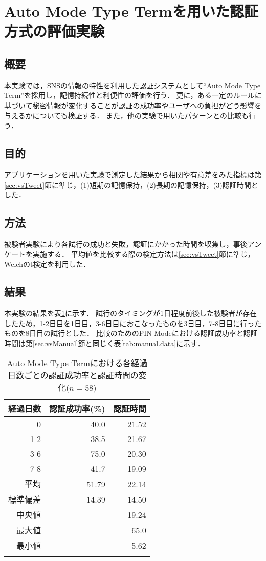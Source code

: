 \section{Auto Mode Type Termを用いた認証方式の評価実験}\label{sec:vsTerm}
\subsection{概要}
本実験では，SNSの情報の特性を利用した認証システムとして``Auto Mode Type Term''を採用し，記憶持続性と利便性の評価を行う．
更に，ある一定のルールに基づいて秘密情報が変化することが認証の成功率やユーザへの負担がどう影響を与えるかについても検証する．
また，他の実験で用いたパターンとの比較も行う．

\subsection{目的}
アプリケーションを用いた実験で測定した結果から相関や有意差をみた指標は第\ref{sec:vsTweet}節に準じ，(1)短期の記憶保持，(2)長期の記憶保持，(3)認証時間とした．

\subsection{方法}
被験者実験により各試行の成功と失敗，認証にかかった時間を収集し，事後アンケートを実施する．
平均値を比較する際の検定方法は\ref{sec:vsTweet}節に準じ，Welchのt検定を利用した．

\subsection{結果}
本実験の結果を表\ref{tab:auto_term.data}に示す．
試行のタイミングが1日程度前後した被験者が存在したため，1-2日目を1日目，3-6日目におこなったものを3日目，7-8日目に行ったものを8日目の試行とした．
比較のためのPIN Modeにおける認証成功率と認証時間は第\ref{sec:vsManual}節と同じく表\ref{tab:manual.data}に示す．
\begin{table}[ht]
  \caption{Auto Mode Type Termにおける各経過日数ごとの認証成功率と認証時間の変化($ n = 58 $)}
  \label{tab:auto_term.data}
  \begin{center}
    \small
    \begin{tabular}{rrr}
      \bhline
      経過日数 & 認証成功率(\%) & 認証時間\\ \hline
      0   & 40.0 & 21.52 \\
      1-2 & 38.5 & 21.67 \\
      3-6 & 75.0 & 20.30 \\
      7-8 & 41.7 & 19.09 \\ \hline \hline
      平均 & 51.79 & 22.14 \\
      標準偏差 & 14.39 & 14.50 \\
      中央値     & & 19.24 \\
      最大値     & & 65.0 \\
      最小値     & & 5.62 \\
      \bhline
    \end{tabular}
  \end{center}
\end{table}

